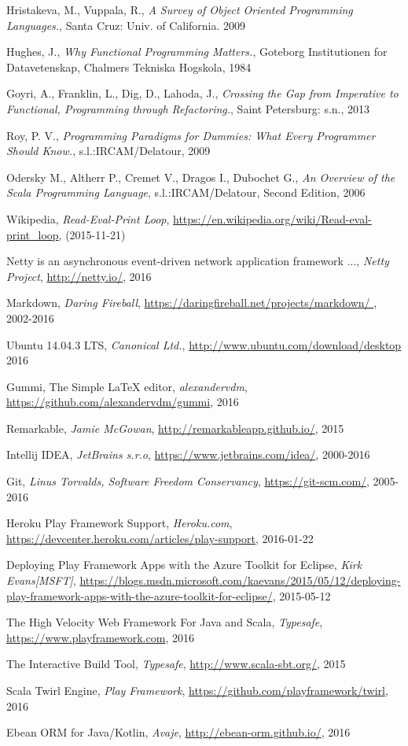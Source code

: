 \documentclass[12pt,twoside,a4paper]{report}
\begin{document}
\begin{thebibliography}{99}
Hristakeva, M., Vuppala, R.,
\emph{A Survey of Object Oriented Programming Languages.},
Santa Cruz: Univ. of California.
2009

Hughes, J.,
\emph{Why Functional Programming Matters.},
Goteborg Institutionen for Datavetenskap,
Chalmers Tekniska Hogskola, 1984


Goyri, A., Franklin, L., Dig, D., Lahoda, J.,
\emph{Crossing the Gap from Imperative to Functional, Programming through Refactoring.},
Saint Petersburg: s.n.,
2013

Roy, P. V.,
\emph{Programming Paradigms for Dummies: What Every Programmer Should Know.},
s.l.:IRCAM/Delatour,
2009

Odersky M., Altherr P., Cremet V., Dragos I., Dubochet G.,
\emph{An Overview of the Scala Programming Language},
s.l.:IRCAM/Delatour,
Second Edition,
2006

Wikipedia,
\emph{Read-Eval-Print Loop},
\url{https://en.wikipedia.org/wiki/Read-eval-print_loop},
(2015-11-21)

Netty is an asynchronous event-driven network application framework ...,
\emph{Netty Project},
\url{http://netty.io/},
2016

Markdown,
\emph{Daring Fireball},
\url{https://daringfireball.net/projects/markdown/	},
2002-2016

Ubuntu 14.04.3 LTS,
\emph{Canonical Ltd.},
\url{http://www.ubuntu.com/download/desktop}
2016

Gummi, The Simple LaTeX editor,
\emph{alexandervdm},
\url{https://github.com/alexandervdm/gummi},
2016

Remarkable,
\emph{Jamie McGowan},
\url{http://remarkableapp.github.io/},
2015

Intellij IDEA,
\emph{JetBrains s.r.o},
\url{https://www.jetbrains.com/idea/},
2000-2016

Git,
\emph{Linus Torvalds, Software Freedom Conservancy},
\url{https://git-scm.com/},
2005-2016

Heroku Play Framework Support,
\emph{Heroku.com},
\url{https://devcenter.heroku.com/articles/play-support},
2016-01-22

Deploying Play Framework Apps with the Azure Toolkit for Eclipse,
\emph{Kirk Evans[MSFT]},
\url{https://blogs.msdn.microsoft.com/kaevans/2015/05/12/deploying-play-framework-apps-with-the-azure-toolkit-for-eclipse/},
2015-05-12

The High Velocity Web Framework For Java and Scala,
\emph{Typesafe},
\url{https://www.playframework.com},
2016

The Interactive Build Tool,
\emph{Typesafe},
\url{http://www.scala-sbt.org/},
2015

Scala Twirl Engine,
\emph{Play Framework},
\url{https://github.com/playframework/twirl},
2016

Ebean ORM for Java/Kotlin,
\emph{Avaje},
\url{http://ebean-orm.github.io/},
2016

\end{thebibliography}
\end{document}
